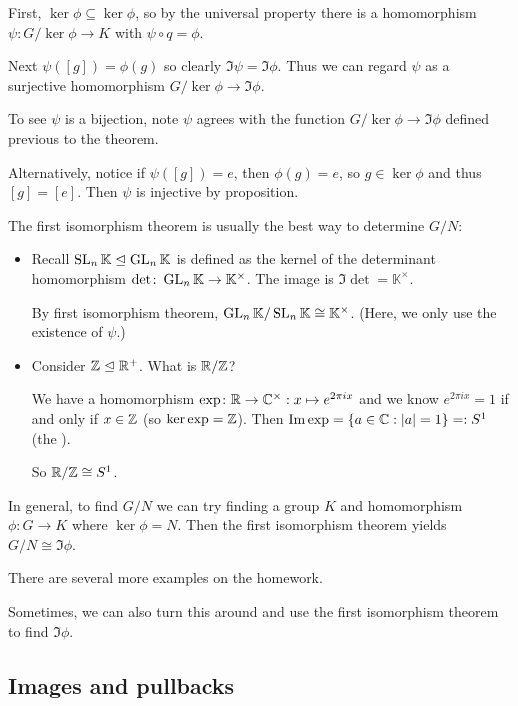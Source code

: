 \documentclass[12pt,letterpaper]{report}
\begin{document}
\begin{thmproof}
  First, $\ker\phi \subseteq \ker\phi$, so by the universal property there is a homomorphism
  $\psi \colon G/\ker\phi \to K$ with $\psi \circ q = \phi$.

  Next $\psi([g]) = \phi(g)$ so clearly $\Im\psi = \Im\phi$.
  Thus we can regard $\psi$ as a surjective homomorphism $G/\ker\phi \to \Im\phi$.

  To see $\psi$ is a bijection, note $\psi$ agrees with the function $G/\ker\phi \to \Im\phi$
  defined previous to the theorem.

  Alternatively, notice if $\psi([g]) = e$, then $\phi(g) = e$, so $g \in \ker\phi$ and thus
  $[g] = [e]$.
  Then $\psi$ is injective by proposition.
\end{thmproof}

\begin{ex}
  The first isomorphism theorem is usually the best way to determine $G/N$:
  \begin{itemize}
    \item
    Recall $\operatorname{SL}_n\mathbb{K} \trianglelefteq \operatorname{GL}_n\mathbb{K}$ is defined as the kernel of the
    determinant homomorphism $\det \colon \operatorname{GL}_n\mathbb{K} \to \mathbb{K}^\times$.
    The image is $\Im\det = \mathbb{K}^\times$.

    By first isomorphism theorem, $\operatorname{GL}_n\mathbb{K} / \operatorname{SL}_n\mathbb{K} \cong \mathbb{K}^\times$.
    (Here, we only use the existence of $\psi$.)
    \item
    Consider $\mathbb{Z} \trianglelefteq \mathbb{R}^+$.
    What is $\mathbb{R}/\mathbb{Z}$?

    We have a homomorphism $\exp \colon \mathbb{R} \to \mathbb{C}^\times : x \mapsto e^{2\pi ix}$
    and we know $e^{2\pi ix} = 1$ if and only if $x \in \mathbb{Z}$ (so $\ker\exp = \mathbb{Z}$).
    Then $\operatorname{Im}\exp = \{a \in \mathbb{C} : \lvert a\rvert = 1\} =: S^1$ (the ).

    So $\mathbb{R}/\mathbb{Z} \cong S^1$.
  \end{itemize}
\end{ex}

In general, to find $G/N$ we can try finding a group $K$ and homomorphism $\phi \colon G \to K$
where $\ker\phi = N$.
Then the first isomorphism theorem yields $G/N \cong \Im\phi$.

There are several more examples on the homework.

Sometimes, we can also turn this around and use the first isomorphism theorem to find $\Im\phi$.

\pagebreak
\subsection{Images and pullbacks}
\end{document}
